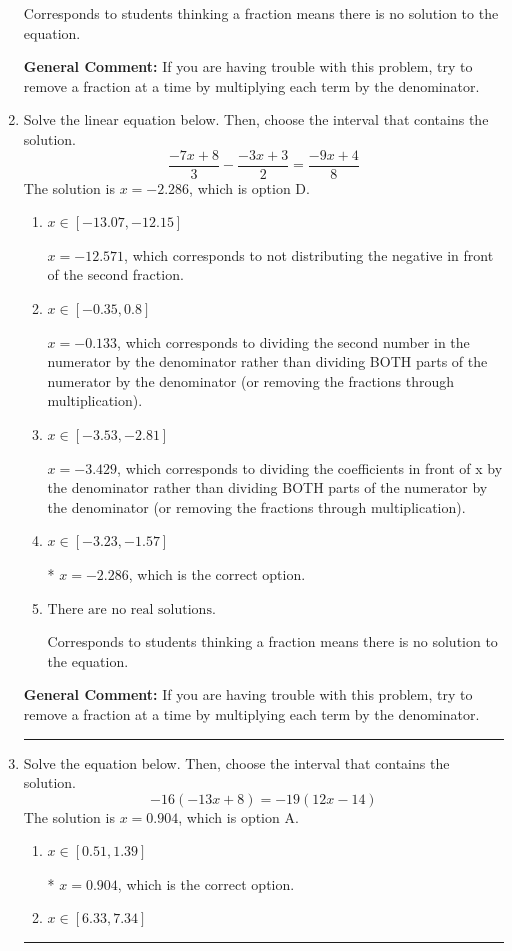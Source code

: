\documentclass{extbook}[14pt]
\newcommand{\litem}[1]{\item #1

\rule{\textwidth}{0.4pt}}
\begin{document}
\begin{enumerate}
{\begin{enumerate}[label=\Alph*.]
Corresponds to students thinking a fraction means there is no solution to the equation.
\end{enumerate}

\textbf{General Comment:} If you are having trouble with this problem, try to remove a fraction at a time by multiplying each term by the denominator.
}
\litem{
Solve the linear equation below. Then, choose the interval that contains the solution.
\[ \frac{-7x + 8}{3} - \frac{-3x + 3}{2} = \frac{-9x + 4}{8} \]The solution is \( x = -2.286 \), which is option D.\begin{enumerate}[label=\Alph*.]
\item \( x \in [-13.07, -12.15] \)

 $x = -12.571$, which corresponds to not distributing the negative in front of the second fraction.
\item \( x \in [-0.35, 0.8] \)

 $x = -0.133$, which corresponds to dividing the second number in the numerator by the denominator rather than dividing BOTH parts of the numerator by the denominator (or removing the fractions through multiplication).
\item \( x \in [-3.53, -2.81] \)

 $x = -3.429$, which corresponds to dividing the coefficients in front of x by the denominator rather than dividing BOTH parts of the numerator by the denominator (or removing the fractions through multiplication).
\item \( x \in [-3.23, -1.57] \)

* $x = -2.286$, which is the correct option.
\item \( \text{There are no real solutions.} \)

Corresponds to students thinking a fraction means there is no solution to the equation.
\end{enumerate}

\textbf{General Comment:} If you are having trouble with this problem, try to remove a fraction at a time by multiplying each term by the denominator.
}
\litem{
Solve the equation below. Then, choose the interval that contains the solution.
\[ -16(-13x + 8) = -19(12x -14) \]The solution is \( x = 0.904 \), which is option A.\begin{enumerate}[label=\Alph*.]
\item \( x \in [0.51, 1.39] \)

* $x = 0.904$, which is the correct option.
\item \( x \in [6.33, 7.34] \)


\end{enumerate}}
\end{enumerate}
\end{document}
